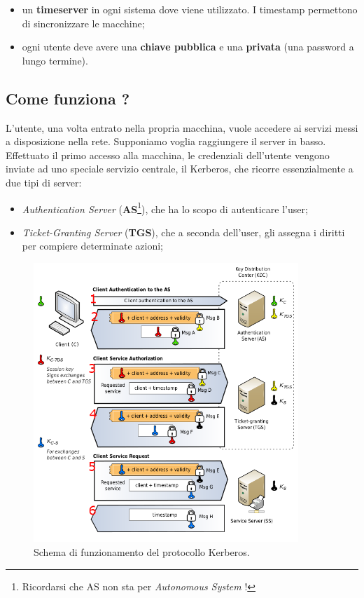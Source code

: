 \begin{itemize}
    \item un \textbf{timeserver} in ogni sistema dove viene utilizzato.
          I timestamp permettono di sincronizzare le macchine;
    \item ogni utente deve avere una \textbf{chiave pubblica} e una \textbf{privata}
          (una password a lungo termine).

\end{itemize}

\subsection{Come funziona ?}

L’utente, una volta entrato nella propria macchina, vuole accedere ai servizi
messi a disposizione nella rete. Supponiamo voglia raggiungere il server in basso.
Effettuato il primo accesso alla macchina, le credenziali dell’utente vengono
inviate ad uno speciale servizio centrale, il Kerberos, che ricorre essenzialmente
a due tipi di server:

\begin{itemize}
    \item \textit{Authentication Server} (\textbf{AS}\footnote{Ricordarsi che
              AS non sta per
              \textit{Autonomous System} !}),
          che ha lo scopo di autenticare l’user;
    \item \textit{Ticket-Granting Server} (\textbf{TGS}), che a seconda dell’user,
          gli assegna i diritti per compiere determinate azioni;
\end{itemize}

\begin{figure}[H]
    \centering
    \includegraphics[width=10cm, keepaspectratio]{capitoli/autenticazione/imgs/kerberos1.png}
    \caption{Schema di funzionamento del protocollo Kerberos.}
\end{figure}

